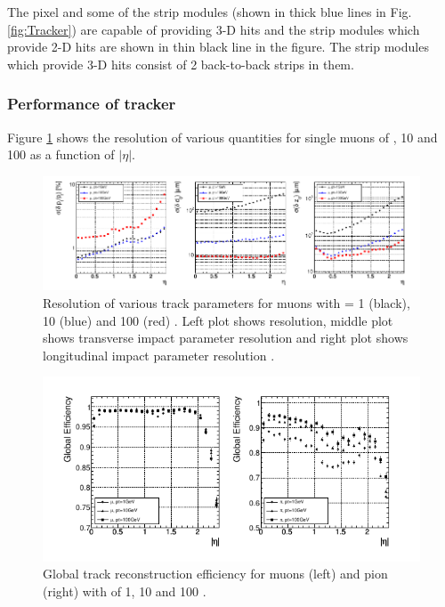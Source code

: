 The pixel and some of the strip modules (shown in thick blue lines in Fig.\ref{fig:Tracker}) are capable of providing 3-D hits and the 
strip modules which provide 2-D hits are shown in thin black line in the figure. The strip modules which provide 3-D hits consist of 2 
back-to-back strips in them.

\subsubsection{Performance of tracker}
Figure \ref{fig:trackerResoln_muons} shows the resolution of various quantities for single muons of , 10 and 100 \gev as a function of $|\eta|$.
\begin{figure}[h!]
\centering
\includegraphics[width=0.98\linewidth]{../Figures/Chap2/trackerResoln_muons}
\captionsetup{width=.9\linewidth}
\caption[Tracker resolution for muons]{Resolution of various track parameters for muons with \pt = 1 \gev (black), 10 \gev (blue) and 100 \gev (red) . Left plot shows \pt resolution, middle plot shows transverse impact parameter resolution and right plot shows longitudinal impact parameter resolution \cite{Chatrchyan:2008aa}.}
\label{fig:trackerResoln_muons}
\end{figure}
\begin{figure}[h!]
\centering
\includegraphics[width=0.98\linewidth]{../Figures/Chap2/trackerEff_muPions}
\caption[Track reconstruction efficiency]{Global track reconstruction efficiency for muons (left) and pion (right) with \pt of 1, 10 and 100 \gev \cite{Chatrchyan:2008aa}.}
\label{fig:trackerEff_muPions}
\end{figure}

